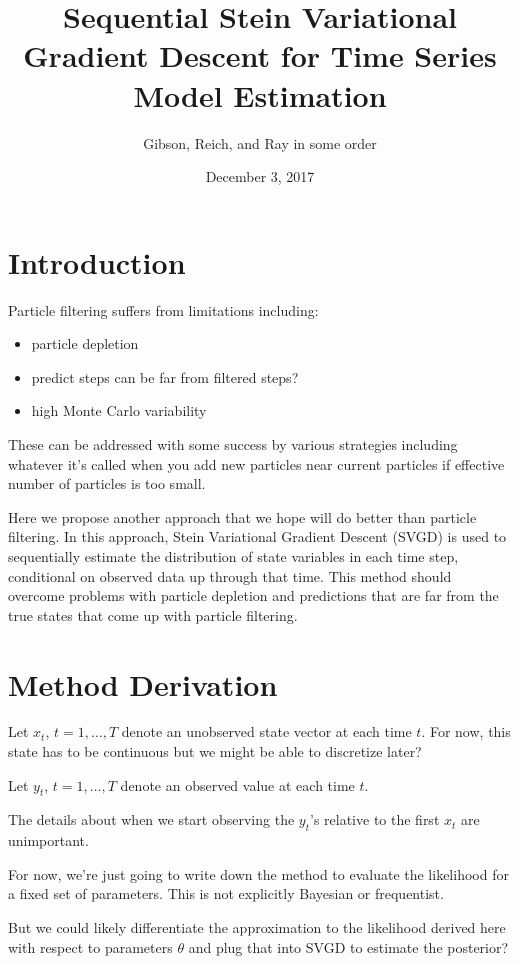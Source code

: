\documentclass[]{article}
\title{Sequential Stein Variational Gradient Descent for Time Series Model
Estimation}
\author{Gibson, Reich, and Ray in some order}
\date{December 3, 2017}
\begin{document}
\maketitle

\section{Introduction}\label{introduction}

Particle filtering suffers from limitations including:

\begin{itemize}
\item particle depletion
\item predict steps can be far from filtered steps?
\item high Monte Carlo variability
\end{itemize}

These can be addressed with some success by various strategies including
whatever it's called when you add new particles near current particles
if effective number of particles is too small.

Here we propose another approach that we hope will do better than
particle filtering. In this approach, Stein Variational Gradient Descent
(SVGD) is used to sequentially estimate the distribution of state
variables in each time step, conditional on observed data up through
that time. This method should overcome problems with particle depletion
and predictions that are far from the true states that come up with
particle filtering.

\section{Method Derivation}\label{method-derivation}

Let \(x_t\), \(t = 1, \ldots, T\) denote an unobserved state vector at
each time \(t\). For now, this state has to be continuous but we might
be able to discretize later?

Let \(y_t\), \(t = 1, \ldots, T\) denote an observed value at each time
\(t\).

The details about when we start observing the \(y_t\)'s relative to the
first \(x_t\) are unimportant.

For now, we're just going to write down the method to evaluate the
likelihood for a fixed set of parameters. This is not explicitly
Bayesian or frequentist.

But we could likely differentiate the approximation to the likelihood
derived here with respect to parameters \(\theta\) and plug that into
SVGD to estimate the posterior?
\end{document}
